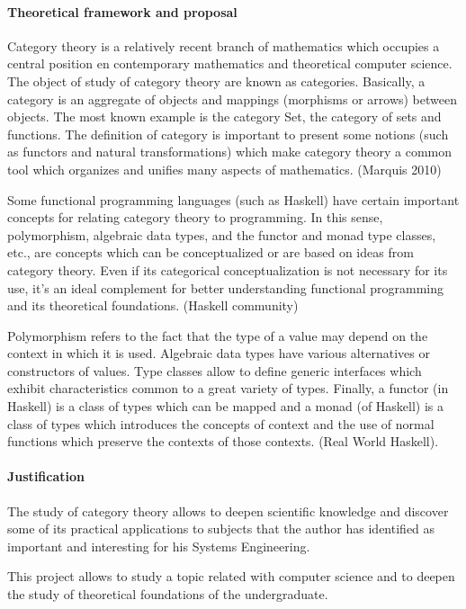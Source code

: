 \paragraph{Theoretical framework and proposal}

Category theory is a relatively recent branch of mathematics which
occupies a central position en contemporary mathematics and
theoretical computer science. The object of study of category theory
are known as categories. Basically, a category is an aggregate of
objects and mappings (morphisms or arrows) between objects. The most
known example is the category Set, the category of sets and functions.
The definition of category is important to present some notions (such
as functors and natural transformations) which make category theory a
common tool which organizes and unifies many aspects of mathematics.
(Marquis 2010)

Some functional programming languages (such as Haskell) have certain
important concepts for relating category theory to programming. In
this sense, polymorphism, algebraic data types, and the functor and
monad type classes, etc., are concepts which can be conceptualized or
are based on ideas from category theory. Even if its categorical
conceptualization is not necessary for its use, it's an ideal
complement for better understanding functional programming and its
theoretical foundations. (Haskell community)

Polymorphism refers to the fact that the type of a value may depend on
the context in which it is used. Algebraic data types have various
alternatives or constructors of values. Type classes allow to define
generic interfaces which exhibit characteristics common to a great
variety of types. Finally, a functor (in Haskell) is a class of types
which can be mapped and a monad (of Haskell) is a class of types which
introduces the concepts of context and the use of normal functions
which preserve the contexts of those contexts. (Real World Haskell).

\paragraph{Justification}

The study of category theory allows to deepen scientific knowledge and
discover some of its practical applications to subjects that the
author has identified as important and interesting for his Systems
Engineering.

This project allows to study a topic related with computer science and
to deepen the study of theoretical foundations of the undergraduate.

